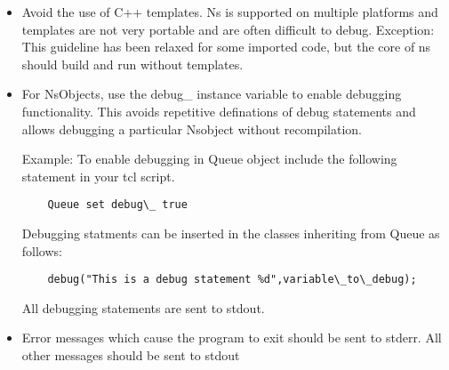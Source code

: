 \begin{itemize}
\item Avoid the use of C++ templates.
Ns is supported on multiple platforms and templates are not
very portable and are often difficult to debug.
Exception: This guideline has been relaxed for some imported code,
but the core of ns should build and run without templates.

\item For NsObjects, use the debug\_ instance variable to enable debugging functionality.
This avoids repetitive definations of debug statements and allows debugging a particular
Nsobject without recompilation.

Example:
To enable debugging in Queue object include the following statement in your tcl script.
\begin{verbatim}
	Queue set debug\_ true
\end{verbatim}

Debugging statments can be inserted in the classes inheriting from Queue as follows:

\begin{verbatim}
	debug("This is a debug statement %d",variable\_to\_debug);
\end{verbatim}

All debugging statements are sent to stdout.


\item Error messages which cause the program to exit should be sent to stderr.
All other messages should be sent to stdout
\end{itemize}
